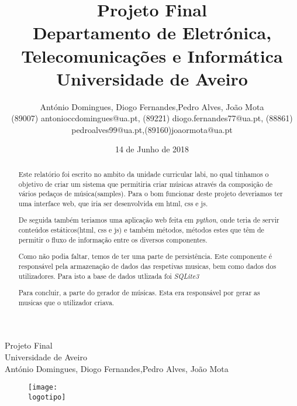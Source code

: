 \documentclass{report}
\begin{document}
%
\def\titulo{Projeto Final}
\def\data{14 de Junho de 2018}
\def\autores{António Domingues, Diogo Fernandes,Pedro Alves, João Mota}
\def\autorescontactos{(89007) antonioccdomingues@ua.pt, (89221) diogo.fernandes77@ua.pt, (88861) pedroalves99@ua.pt,(89160)joaormota@ua.pt}

\def\versao{}
\def\departamento{Departamento de Eletrónica, Telecomunicações e Informática}
\def\empresa{Universidade de Aveiro}
\def\logotipo{ua.pdf}
%
%
\begin{titlepage}

\begin{center}
%
\vspace*{50mm}
%
{\Huge \titulo}\\ 
%
\vspace{10mm}
%
{\Large \empresa}\\
%
\vspace{10mm}
%
{\LARGE \autores}\\ 
%
\vspace{30mm}
%
\begin{figure}[h]
\center
\texttt{[image: \\logotipo]}
\end{figure}
%
\vspace{30mm}
\end{center}
%
\begin{flushright}
\versao
\end{flushright}
\end{titlepage}

\title{%
{\Huge\textbf{\titulo}}\\
{\Large \departamento\\ \empresa}
}
%
\author{%
    \autores \\
    \autorescontactos
}
%
\date{\data}
%
\maketitle


\renewcommand{\abstractname}{Resumo}
\begin{abstract}
Este relatório foi escrito no ambito da unidade curricular \ac{labi}, no qual tinhamos o objetivo de criar um sistema que permitiria criar músicas através da composição de vários pedaços de música(samples). Para o bom funcionar deste projeto deveriamos ter uma interface web, que iria ser desenvolvida em \ac{html}, \ac{css} e \ac{js}. 

De seguida também teriamos uma aplicação web feita em \textit{python}, onde teria de servir conteúdos estáticos(\ac{html}, \ac{css} e \ac{js}) e também métodos, métodos estes que têm de permitir o fluxo de informação entre os diversos componentes.

Como não podia faltar, temos de ter uma parte de persistência. Este componente é responsável pela armazenação de dados das respetivas musicas, bem como dados dos utilizadores. Para isto a base de dados utlizada foi \textit{SQLite3}

Para concluir, a parte do gerador de músicas. Esta era responsável por gerar as musicas que o utilizador criava.
\end{abstract}
\end{document}
